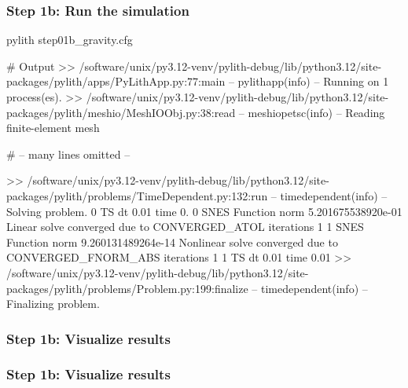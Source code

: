 \documentclass[aspectratio=169]{beamer}
\begin{document}
\begin{frame}[fragile]
  \frametitle{Step 1b: Run the simulation}
  \summary{}

\begin{bashcode}
pylith step01b_gravity.cfg

# Output
 >> /software/unix/py3.12-venv/pylith-debug/lib/python3.12/site-packages/pylith/apps/PyLithApp.py:77:main
 -- pylithapp(info)
 -- Running on 1 process(es).
 >> /software/unix/py3.12-venv/pylith-debug/lib/python3.12/site-packages/pylith/meshio/MeshIOObj.py:38:read
 -- meshiopetsc(info)
 -- Reading finite-element mesh

# -- many lines omitted --

 >> /software/unix/py3.12-venv/pylith-debug/lib/python3.12/site-packages/pylith/problems/TimeDependent.py:132:run
 -- timedependent(info)
 -- Solving problem.
0 TS dt 0.01 time 0.
    0 SNES Function norm 5.201675538920e-01
      Linear solve converged due to CONVERGED_ATOL iterations 1
    1 SNES Function norm 9.260131489264e-14
    Nonlinear solve converged due to CONVERGED_FNORM_ABS iterations 1
1 TS dt 0.01 time 0.01
 >> /software/unix/py3.12-venv/pylith-debug/lib/python3.12/site-packages/pylith/problems/Problem.py:199:finalize
 -- timedependent(info)
 -- Finalizing problem.
\end{bashcode}
  
\end{frame}



\begin{frame}
  \frametitle{Step 1b: Visualize results}

    
\end{frame}


\begin{frame}
  \frametitle{Step 1b: Visualize results}

    
\end{frame}
\end{document}
